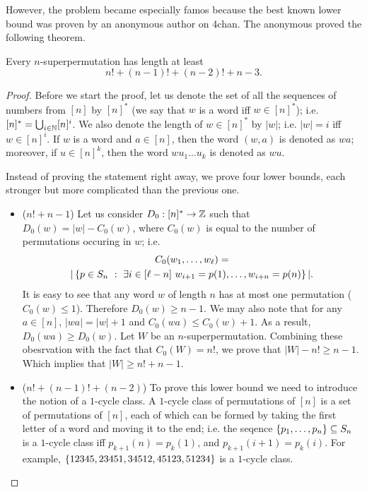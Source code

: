 However, the problem became especially famos because the best known lower bound
was proven by an anonymous author on 4chan. The anonymous proved the following
theorem.
\begin{theorem}
  Every $n$-superpermutation has length at least
  \[
    n! + (n - 1)! + (n - 2)! + n - 3.
  \]
\end{theorem}
\begin{proof}
  Before we start the proof, let us denote the set of all the sequences of
  numbers from $[n]$ by $[n]^*$ (we say that $w$ is a word iff $w \in [n]^*$);
  i.e. $[n]^* = \bigcup_{i \in \mathbb{N}} [n]^i$. We also denote the length of
  $w \in [n]^*$ by $|w|$; i.e. $|w| = i$ iff $w \in [n]^i$. If $w$ is a word
  and $a \in [n]$, then the word $(w, a)$ is denoted as $wa$; moreover,
  if $u \in [n]^k$, then the word $w u_1 \dots u_k$ is denoted as $wu$.

  Instead of proving the statement right away, we prove four lower bounds, each
  stronger but more complicated than the previous one.

  \begin{itemize}
    \item ($n! + n - 1$) Let us consider $D_0 : [n]^* \to \mathbb{Z}$ such that
      $D_0(w) = |w| - C_0(w)$, where $C_0(w)$ is equal to the
      number of permutations occuring in $w$; i.e.
      \begin{multline*}
        C_0(w_1, \dots, w_\ell) = \\
          |\set[{
            \exists i \in [\ell - n] ~
              w_{i + 1} = p(1), \dots, w_{i + n} = p(n)
            }]{p \in S_n}|.
      \end{multline*}
      It is easy to see that any word $w$ of length $n$ has at most one
      permutation ($C_0(w) \le 1$). Therefore $D_0(w) \ge n - 1$.  We may also
      note that for any $a \in [n]$, $|wa| = |w| + 1$ and
      $C_0(wa) \le C_0(w) + 1$. As a result, $D_0(wa) \ge D_0(w)$.
      Let $W$ be an $n$-superpermutation.
      Combining these obesrvation with the fact that $C_0(W) = n!$, we prove
      that $|W| - n! \ge n - 1$. Which implies that $|W| \ge n! + n - 1$.
    \item ($n! + (n - 1)! + (n - 2)$)
      To prove this lower bound we need to introduce the notion of a $1$-cycle
      class.
      A $1$-cycle class of permutations of $[n]$ is a
      set of permutations of $[n]$, each of which can be
      formed by taking the first letter of a word and moving it to the end;
      i.e. the seqence $\set{p_1, \dots, p_n} \subseteq S_n$ is a $1$-cycle
      class iff $p_{k + 1}(n) = p_k(1)$, and $p_{k + 1}(i + 1) = p_k(i)$. For
      example, $\set{12345, 23451, 34512, 45123, 51234}$ is a $1$-cycle class.


\end{itemize}
\end{proof}
